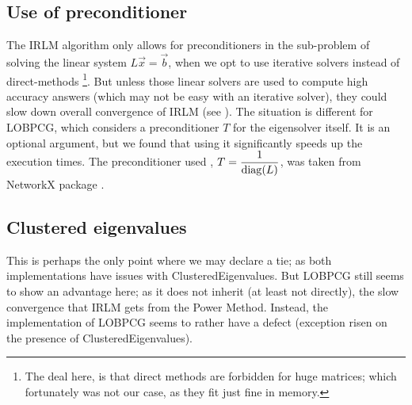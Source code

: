 \subsection{Use of preconditioner}

The \gls{IRLM} algorithm only allows for preconditioners in the
sub-problem of solving the linear system $L\vec{x} = \vec{b}$, when we
opt to use iterative solvers instead of direct-methods \footnote{The deal
  here, is that direct methods are forbidden for huge matrices; which
  fortunately was not our case, as they fit just fine in memory.}. But
unless those linear solvers are used to compute high accuracy
answers (which may not be easy with an iterative solver), they could
slow down overall  convergence of \gls{IRLM} (see \cite{knyazev03}). The
situation is different for \gls{LOBPCG}, which considers a preconditioner $T$ for
the eigensolver itself. It is an optional argument, but we found that using
it significantly speeds up the execution times. The preconditioner
used , $T = \dfrac{1}{\operatorname{diag}(L)} $, was taken from NetworkX
package \cite{networkx}.

\subsection{Clustered eigenvalues}

This is perhaps the only point where we may declare a tie; as both
implementations have issues with \gls{ClusteredEigenvalues}. But
\gls{LOBPCG} still seems to show an advantage here; as it does not
inherit (at least not directly), the slow convergence that \gls{IRLM}
gets from the Power Method. Instead, the implementation of
\gls{LOBPCG} seems to rather have a defect (exception risen on the
presence of \gls{ClusteredEigenvalues}).

